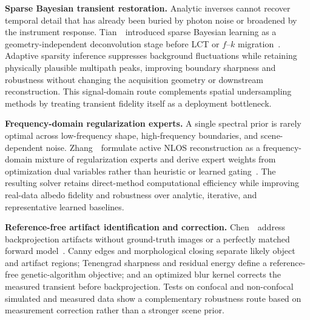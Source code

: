 \vspace{0.8mm}
\noindent \textbf{Sparse Bayesian transient restoration.}
Analytic inverses cannot recover temporal detail that has already been buried by photon noise or broadened by the instrument response. Tian~\etal~introduced sparse Bayesian learning as a geometry-independent deconvolution stage before LCT or $f$--$k$ migration~\cite{tianSparseBayesianNLOS2026}. Adaptive sparsity inference suppresses background fluctuations while retaining physically plausible multipath peaks, improving boundary sharpness and robustness without changing the acquisition geometry or downstream reconstruction. This signal-domain route complements spatial undersampling methods by treating transient fidelity itself as a deployment bottleneck.

\vspace{0.8mm}
\noindent \textbf{Frequency-domain regularization experts.}
A single spectral prior is rarely optimal across low-frequency shape, high-frequency boundaries, and scene-dependent noise. Zhang~\etal~formulate active NLOS reconstruction as a frequency-domain mixture of regularization experts and derive expert weights from optimization dual variables rather than heuristic or learned gating~\cite{zhangFrequencyMoENLOS2026}. The resulting solver retains direct-method computational efficiency while improving real-data albedo fidelity and robustness over analytic, iterative, and representative learned baselines.

\vspace{0.8mm}
\noindent \textbf{Reference-free artifact identification and correction.}
Chen~\etal~address backprojection artifacts without ground-truth images or a perfectly matched forward model~\cite{chenCannyArtifactNLOS2026}. Canny edges and morphological closing separate likely object and artifact regions; Tenengrad sharpness and residual energy define a reference-free genetic-algorithm objective; and an optimized blur kernel corrects the measured transient before backprojection. Tests on confocal and non-confocal simulated and measured data show a complementary robustness route based on measurement correction rather than a stronger scene prior.

